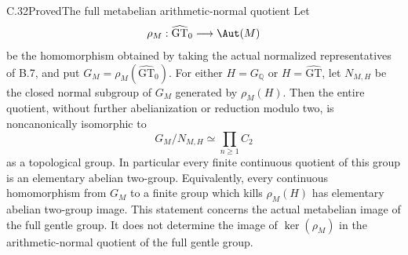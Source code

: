 \begin{statement}{C.32}{Proved}{The full metabelian arithmetic-normal quotient}
Let
\[
 \rho_M:\widehat{\mathrm{GT}}_0\longrightarrow\Aut(M)
\]
be the homomorphism obtained by taking the actual normalized
representatives of B.7, and put
$G_M=\rho_M(\widehat{\mathrm{GT}}_0)$.
For either $H=G_{\mathbb Q}$ or
$H=\widehat{\mathrm{GT}}$, let $N_{M,H}$ be the closed normal
subgroup of $G_M$ generated by $\rho_M(H)$.
Then the entire quotient, without further abelianization or
reduction modulo two, is noncanonically isomorphic to
\[
                G_M/N_{M,H}\simeq\prod_{n\geq1}C_2
                \tag{C.32.1}
\]
as a topological group.
In particular every finite continuous quotient of this group is
an elementary abelian two-group. Equivalently, every continuous
homomorphism from $G_M$ to a finite group which kills $\rho_M(H)$
has elementary abelian two-group image.
This statement concerns the actual metabelian image of the full
gentle group. It does not determine the image of $\ker(\rho_M)$ in the
arithmetic-normal quotient of the full gentle group.
\end{statement}
